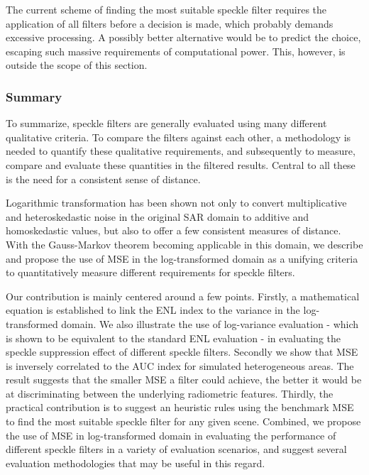 The current scheme of finding the most suitable speckle filter requires the application of all filters before 
a decision is made, which probably demands excessive processing. 
A possibly better alternative would be to predict the choice, escaping such massive requirements of computational power.
This, however, is outside the scope of this section.

\subsubsection{Summary}

To summarize, speckle filters are generally evaluated using many different qualitative criteria.
To compare the filters against each other, a methodology is needed
  to quantify these qualitative requirements,
  and subsequently to measure, compare and evaluate these quantities in the filtered results.
Central to all these is the need for a consistent sense of distance.

Logarithmic transformation has been shown 
  not only to convert multiplicative and heteroskedastic noise in the original SAR domain to additive and homoskedastic values,
  but also to offer a few consistent measures of distance.
With the Gauss-Markov theorem becoming applicable in this domain, we describe and propose the use of MSE in the 
log-transformed domain as a unifying criteria to quantitatively measure different requirements for speckle filters.

Our contribution is mainly centered around a few points. 
Firstly, a mathematical equation is established to link the ENL index to the variance in the log-transformed domain. 
We also illustrate the use of log-variance evaluation -
  which is shown to be equivalent to the standard ENL evaluation -
  in evaluating the speckle suppression effect of different speckle filters.
Secondly we show that MSE is inversely correlated to the AUC index for simulated heterogeneous areas.
The result suggests that the smaller MSE a filter could achieve, the better it would
be at discriminating between the underlying radiometric features.
Thirdly, the practical contribution is to suggest an heuristic rules using the benchmark MSE to find 
the most suitable speckle filter for any given scene. 
Combined, we propose the use of MSE in log-transformed domain in evaluating the performance of different speckle filters in a variety of evaluation scenarios, and suggest several evaluation methodologies that may be useful in this regard.

